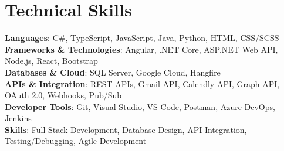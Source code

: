 \documentclass[letterpaper,11pt]{article}
\begin{document}
\section{Technical Skills}
 \begin{itemize}[leftmargin=0.15in, label={}]
    \small{\item{
     \textbf{Languages}{: C\#, TypeScript, JavaScript, Java, Python, HTML, CSS/SCSS} \\
     \textbf{Frameworks \& Technologies}{: Angular, .NET Core, ASP.NET Web API, Node.js, React, Bootstrap} \\
     \textbf{Databases \& Cloud}{: SQL Server, Google Cloud, Hangfire} \\
     \textbf{APIs \& Integration}{: REST APIs, Gmail API, Calendly API, Graph API, OAuth 2.0, Webhooks, Pub/Sub} \\
     \textbf{Developer Tools}{: Git, Visual Studio, VS Code, Postman, Azure DevOps, Jenkins} \\
     \textbf{Skills}{: Full-Stack Development, Database Design, API Integration, Testing/Debugging, Agile Development}
    }}
 \end{itemize}

\end{document}
